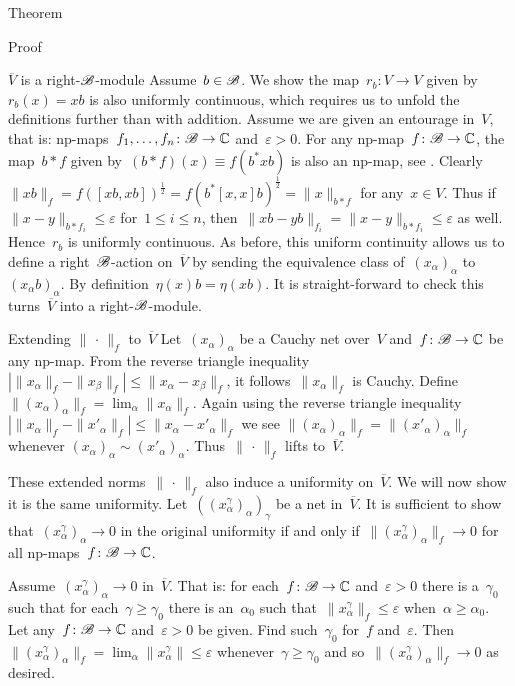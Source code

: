 \documentclass[b]{subfiles}
\begin{document}
\begin{parsec}
\begin{point}{Theorem}
\begin{point}{Proof}
\begin{point}{$\overline{V}$ is a right-$\mathscr{B}$-module}
Assume~$b \in \mathscr{B}$. We show the map~$r_b\colon V \to V$
given by~$r_b(x) = xb$ is also uniformly continuous,
which requires us to unfold the definitions further
than with addition.
Assume we are given an entourage in~$V$,
that is: np-maps~$f_1,\ldots,f_n\colon \mathscr{B} \to \mathbb{C}$
and~$\varepsilon > 0$.
For any np-map~$f\colon \mathscr{B} \to \mathbb{C}$,
    the map~$b*f$ given by~$(b * f)(x) \equiv f(b^* x b)$ is also an np-map,
    see .
    Clearly~$\|xb\|_f = f([xb,xb])^{\frac{1}{2}}
    = f(b^* [x,x] b)^{\frac{1}{2}} = \|x\|_{b*f}$
    for any~$x \in V$.
Thus if~$\|x-y\|_{b*f_i} \leq \varepsilon$ for~$1 \leq i \leq n$,
then~$\|xb-yb\|_{f_i} = \|x-y\|_{b*f_i} \leq \varepsilon$
as well. Hence~$r_b$ is uniformly continuous.
As before, this uniform continuity
allows us to define a right~$\mathscr{B}$-action on~$\overline{V}$
by sending the equivalence class of~$(x_\alpha)_\alpha$
to~$(x_\alpha b)_\alpha$. By definition~$\eta(x)b = \eta(xb)$.
It is straight-forward to check this turns~$\overline{V}$
into a right-$\mathscr{B}$-module.
\end{point}
\begin{point}{Extending $\|\,\cdot\,\|_f$ to~$\overline{V}$}%
Let~$(x_\alpha)_\alpha$ be a Cauchy net over~$V$
    and~$f\colon \mathscr{B} \to \mathbb{C}$ be any np-map.
From the reverse triangle inequality~$| \|x_\alpha \|_f - \|x_\beta\|_f |
        \leq \|x_\alpha - x_\beta \|_f$,
        it follows~$\| x_\alpha \|_f$ is Cauchy.
Define~$\|(x_\alpha)_\alpha\|_f = \lim_\alpha \|x_\alpha\|_f$.
Again using the reverse triangle
    inequality~$| \|x_\alpha \|_f - \|x'_\alpha\|_f |
        \leq \|x_\alpha - x'_\alpha \|_f$
        we see $\|(x_\alpha)_\alpha\|_f =
        \|(x'_\alpha)_\alpha\|_f$
        whenever $(x_\alpha)_\alpha \sim (x'_\alpha)_\alpha$.
Thus~$\|\,\cdot\,\|_f$ lifts to~$\overline{V}$.

These extended norms~$\|\,\cdot\,\|_f$ also induce a uniformity
    on~$\overline{V}$.  We will now show it is the same uniformity.
    Let~$((x_\alpha^\gamma)_\alpha)_\gamma$ be a net in~$\overline{V}$.
    It is sufficient to show that~$(x_\alpha^\gamma)_\alpha \to 0$
    in the original uniformity
    if and only if~$\|(x_\alpha^\gamma)_\alpha\|_f \to 0$
        for all np-maps~$f\colon \mathscr{B} \to \mathbb{C}$.

Assume~$(x^\gamma_\alpha)_\alpha \to 0$ in~$\overline{V}$.
That is: for each~$f\colon \mathscr{B} \to \mathbb{C}$ and~$\varepsilon > 0$
    there is a~$\gamma_0$
    such that for each~$\gamma \geq \gamma_0$
    there is an~$\alpha_0$
    such that~$\|x^\gamma_\alpha\|_f \leq \varepsilon$
    when~$\alpha \geq \alpha_0$.
Let any~$f\colon \mathscr{B} \to \mathbb{C}$ and~$\varepsilon > 0$ be given.
Find such~$\gamma_0$ for~$f$ and~$\varepsilon$.
Then~$\|(x^\gamma_\alpha)_\alpha \|_f
    = \lim_\alpha \|x^\gamma_\alpha\| \leq \varepsilon$
    whenever~$\gamma \geq \gamma_0$
    and so~$\|(x^\gamma_\alpha)_\alpha\|_f \to 0$ as desired.


\end{point}
\end{point}
\end{point}
\end{parsec}
\end{document}
